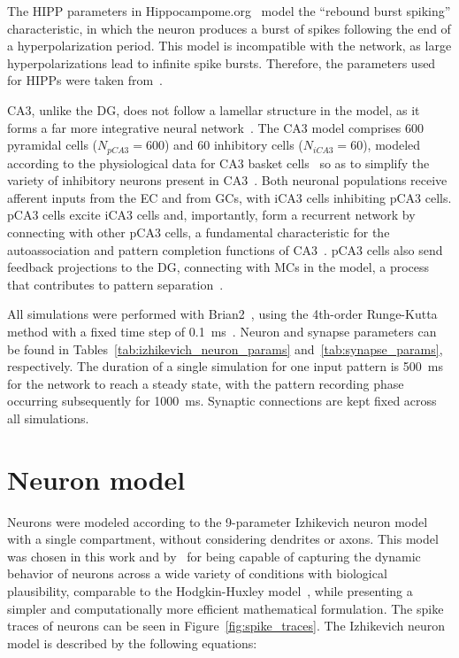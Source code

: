 The HIPP parameters in Hippocampome.org~\parencite{wheelerHippocampomeorg2023} model the ``rebound burst spiking'' characteristic,
in which the neuron produces a burst of spikes following the end of a hyperpolarization period. This model is incompatible with
the network, as large hyperpolarizations lead to infinite spike bursts. Therefore, the parameters used for HIPPs were taken
from~\textcite{modakIzhikevich2018}.

CA3, unlike the DG, does not follow a lamellar structure in the model, as it forms a far more integrative neural
network~\parencite{pakHippocampal2022, watsonHuman2025}. The CA3 model comprises 600 pyramidal cells ($N_{pCA3} = 600$) and 60
inhibitory cells ($N_{iCA3} = 60$), modeled according to the physiological data for CA3 basket cells~\parencite{wheelerHippocampomeorg2023}
so as to simplify the variety of inhibitory neurons present in CA3~\parencite{kopsickFormation2024}. Both neuronal populations
receive afferent inputs from the EC and from GCs, with iCA3 cells inhibiting pCA3 cells. pCA3 cells excite iCA3 cells and,
importantly, form a recurrent network by connecting with other pCA3 cells, a fundamental characteristic for the autoassociation
and pattern completion functions of CA3~\parencite{kopsickFormation2024, rollsMechanisms2013}. pCA3 cells also send feedback
projections to the DG, connecting with MCs in the model, a process that contributes to pattern
separation~\parencite{myersPattern2011}.

All simulations were performed with Brian2~\parencite{stimbergBrian2019a}, using the 4th-order Runge-Kutta method with a fixed time
step of \SI{0.1}{\milli\second}~\parencite{butcherHistory1996}. Neuron and synapse parameters can be found in
Tables~\ref{tab:izhikevich_neuron_params} and~\ref{tab:synapse_params}, respectively. The duration of a single simulation for
one input pattern is \SI{500}{\milli\second} for the network to reach a steady state, with the pattern recording phase
occurring subsequently for \SI{1000}{\milli\second}. Synaptic connections are kept fixed across all simulations.



\section{Neuron model}

Neurons were modeled according to the 9-parameter Izhikevich neuron model~\parencite[cap.~8]{izhikevichDynamical2006} with a single
compartment, without considering dendrites or axons. This model was chosen in this work and by~\textcite{wheelerHippocampomeorg2023}
for being capable of capturing the dynamic behavior of neurons across a wide variety of conditions with biological plausibility,
comparable to the Hodgkin-Huxley model~\parencite{hodgkinQuantitative1952b}, while presenting a simpler and computationally more
efficient mathematical formulation. The spike traces of neurons can be seen in Figure~\ref{fig:spike_traces}. The Izhikevich
neuron model is described by the following equations:


